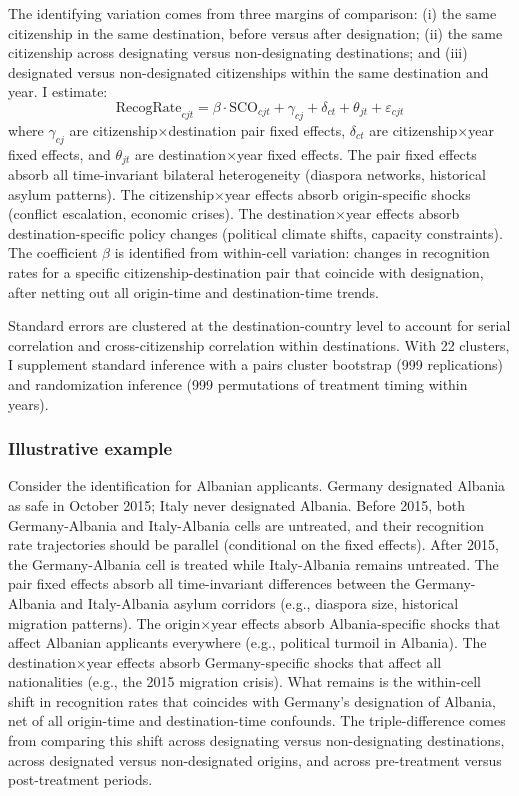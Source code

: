 \documentclass[12pt]{article}
\begin{document}
The identifying variation comes from three margins of comparison: (i) the same citizenship in the same destination, before versus after designation; (ii) the same citizenship across designating versus non-designating destinations; and (iii) designated versus non-designated citizenships within the same destination and year. I estimate:
\begin{equation}
\text{RecogRate}_{cjt} = \beta \cdot \text{SCO}_{cjt} + \gamma_{cj} + \delta_{ct} + \theta_{jt} + \varepsilon_{cjt}
\label{eq:main}
\end{equation}
where $\gamma_{cj}$ are citizenship$\times$destination pair fixed effects, $\delta_{ct}$ are citizenship$\times$year fixed effects, and $\theta_{jt}$ are destination$\times$year fixed effects. The pair fixed effects absorb all time-invariant bilateral heterogeneity (diaspora networks, historical asylum patterns). The citizenship$\times$year effects absorb origin-specific shocks (conflict escalation, economic crises). The destination$\times$year effects absorb destination-specific policy changes (political climate shifts, capacity constraints). The coefficient $\beta$ is identified from within-cell variation: changes in recognition rates for a specific citizenship-destination pair that coincide with designation, after netting out all origin-time and destination-time trends.

Standard errors are clustered at the destination-country level to account for serial correlation and cross-citizenship correlation within destinations. With 22 clusters, I supplement standard inference with a pairs cluster bootstrap (999 replications) and randomization inference (999 permutations of treatment timing within years).

\subsubsection*{Illustrative example} Consider the identification for Albanian applicants. Germany designated Albania as safe in October 2015; Italy never designated Albania. Before 2015, both Germany-Albania and Italy-Albania cells are untreated, and their recognition rate trajectories should be parallel (conditional on the fixed effects). After 2015, the Germany-Albania cell is treated while Italy-Albania remains untreated. The pair fixed effects absorb all time-invariant differences between the Germany-Albania and Italy-Albania asylum corridors (e.g., diaspora size, historical migration patterns). The origin$\times$year effects absorb Albania-specific shocks that affect Albanian applicants everywhere (e.g., political turmoil in Albania). The destination$\times$year effects absorb Germany-specific shocks that affect all nationalities (e.g., the 2015 migration crisis). What remains is the within-cell shift in recognition rates that coincides with Germany's designation of Albania, net of all origin-time and destination-time confounds. The triple-difference comes from comparing this shift across designating versus non-designating destinations, across designated versus non-designated origins, and across pre-treatment versus post-treatment periods.
\end{document}
